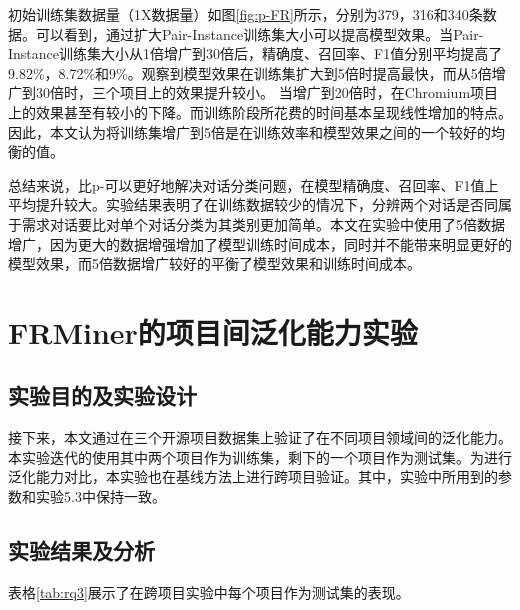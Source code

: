 初始训练集数据量（1X数据量）如图\ref{fig:p-FR}所示，分别为379，316和340条数据。可以看到，通过扩大Pair-Instance训练集大小可以提高模型效果。当Pair-Instance训练集大小从1倍增广到30倍后，精确度、召回率、F1值分别平均提高了9.82\%，8.72\%和9\%。观察到模型效果在训练集扩大到5倍时提高最快，而从5倍增广到30倍时，三个项目上的效果提升较小。 当增广到20倍时，在Chromium项目上的效果甚至有较小的下降。而训练阶段所花费的时间基本呈现线性增加的特点。因此，本文认为将训练集增广到5倍是在训练效率和模型效果之间的一个较好的均衡的值。

总结来说，{\tool}比p-{\tool}可以更好地解决对话分类问题，在模型精确度、召回率、F1值上平均提升较大。实验结果表明了在训练数据较少的情况下，分辨两个对话是否同属于需求对话要比对单个对话分类为其类别更加简单。本文在实验中使用了5倍数据增广，因为更大的数据增强增加了模型训练时间成本，同时并不能带来明显更好的模型效果，而5倍数据增广较好的平衡了模型效果和训练时间成本。


\section{FRMiner的项目间泛化能力实验}
\subsection{实验目的及实验设计}
接下来，本文通过在三个开源项目数据集上验证了{\tool}在不同项目领域间的泛化能力。本实验迭代的使用其中两个项目作为训练集，剩下的一个项目作为测试集。为进行泛化能力对比，本实验也在基线方法上进行跨项目验证。其中，实验中所用到的参数和实验5.3中保持一致。


\subsection{实验结果及分析}

表格\ref{tab:rq3}展示了在跨项目实验中每个项目作为测试集的表现。


